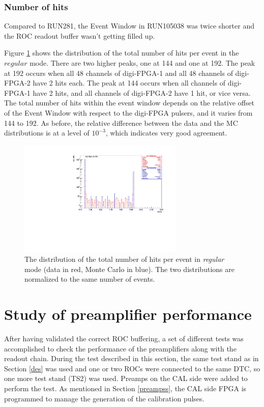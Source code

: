 \subsubsection{Number of hits}
Compared to RUN281, the Event Window in RUN105038 
was twice shorter
and the ROC readout buffer wasn't getting filled up.

Figure \ref{fig:6} shows the distribution of the total 
number of hits per event in the $regular$ mode. 
There are two higher peaks, one at 144 and one at 192. 
The peak at 192 occurs when all 48 channels of digi-FPGA-1 
and all 48 channels of digi-FPGA-2 have 2 hits each. The 
peak at 144 occurs when all channels of digi-FPGA-1 have 
2 hits, and all channels of digi-FPGA-2 have 1 hit, 
or vice versa. The total number of hits within the event 
window depends on the relative offset of the Event Window 
with respect to the digi-FPGA pulsers, and it varies from 
144 to 192. As before, the relative difference between the 
data and the MC distributions is at a level of $10^{-3}$, 
which indicates very good agreement.
\begin{figure}[!h]
\centering
\includegraphics[width =0.7\textwidth]{figures/pdf/figure_00009_nhits_105038.pdf}
\caption[The distribution of the total number of hits per event in \textit{regular} mode.]{
  The distribution of the total number of hits per event in \textit{regular} mode 
  (data in red, Monte Carlo in blue). The two distributions 
  are normalized to the same number of events.
}
\label{fig:6}
\end{figure}


\section{Study of preamplifier performance}\label{dqm}
After having validated the correct ROC buffering, 
a set of different tests was accomplished to check 
the performance of the preamplifiers along with the readout chain.
During the test described in this section, the 
same test stand as in Section \ref{des} was 
used and one or two ROCs 
were connected to the same DTC, so one more 
test stand (TS2) was used. Preamps on the CAL 
side were added to perform the test. 
As mentioned in Section \ref{preampss}, the CAL side FPGA
is programmed to manage the generation of the calibration pulses. 

